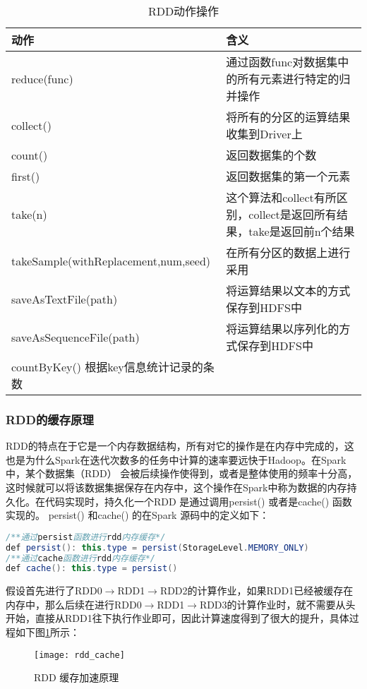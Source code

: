 \begin{table}[h] %
\caption{RDD动作操作} %
\centering
\label{tab:action}
\begin{tabular}{p{6cm}|p{8cm}} %
\hline
\hline
动作  & 含义 \\ %
\hline %
reduce(func)  & 通过函数func对数据集中的所有元素进行特定的归并操作\\
\hline
collect()  & 将所有的分区的运算结果收集到Driver上\\
\hline
count()  & 返回数据集的个数\\
\hline
first() & 返回数据集的第一个元素\\
\hline
take(n) & 这个算法和collect有所区别，collect是返回所有结果，take是返回前n个结果\\
\hline
takeSample(withReplacement,num,seed) & 在所有分区的数据上进行采用\\
\hline
saveAsTextFile(path) & 将运算结果以文本的方式保存到HDFS中\\
\hline
saveAsSequenceFile(path) & 将运算结果以序列化的方式保存到HDFS中\\
\hline
countByKey() 根据key信息统计记录的条数\\
\hline
\hline
\end{tabular}
\end{table}

\subsubsection{RDD的缓存原理}
RDD的特点在于它是一个内存数据结构，所有对它的操作是在内存中完成的，这也是为什么Spark在迭代次数多的任务中计算的速率要远快于Hadoop。在Spark中，某个数据集（RDD） 会被后续操作使得到，或者是整体使用的频率十分高，这时候就可以将该数据集据保存在内存中，这个操作在Spark中称为数据的内存持久化。在代码实现时，持久化一个RDD 是通过调用persist() 或者是cache() 函数实现的。 persist() 和cache() 的在Spark 源码中的定义如下：
\begin{lstlisting}[language=Java,numbers=none,frame=none]
/**通过persist函数进行rdd内存缓存*/
def persist(): this.type = persist(StorageLevel.MEMORY_ONLY)
/**通过cache函数进行rdd内存缓存*/
def cache(): this.type = persist()
\end{lstlisting}

假设首先进行了RDD0$\rightarrow$RDD1$\rightarrow$RDD2的计算作业，如果RDD1已经被缓存在内存中，那么后续在进行RDD0$\rightarrow$RDD1$\rightarrow$RDD3的计算作业时，就不需要从头开始，直接从RDD1往下执行作业即可，因此计算速度得到了很大的提升，具体过程如下图\ref{fig:rdd_cache}所示：
\begin{figure}[htp]
\centering
\texttt{[image: rdd\_cache]}
\caption{RDD 缓存加速原理}
\label{fig:rdd_cache}
\end{figure}

